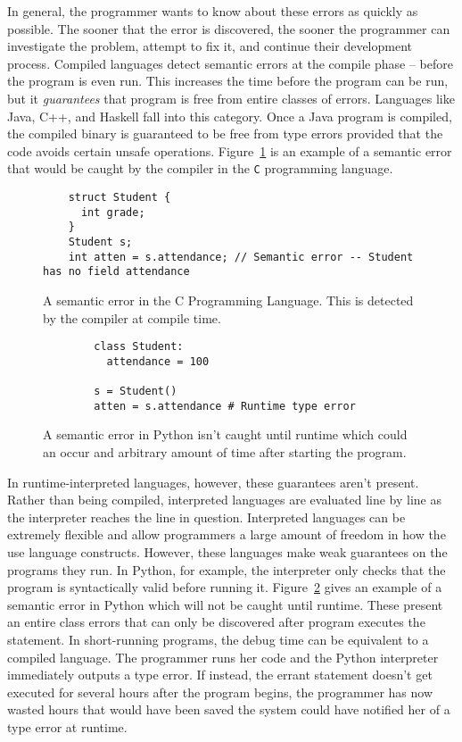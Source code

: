 \documentclass{article}[12pt]
\begin{document}
In general, the programmer wants to know about these errors as quickly as possible. The sooner that the error is
discovered, the sooner the programmer can investigate the problem, attempt to fix it, and continue their development
process. Compiled languages detect semantic errors at the compile phase -- before the program is even run. This
increases the time before the program can be run, but it \emph{guarantees} that program is free from entire classes of
errors. Languages like Java, C++, and Haskell fall into this category. Once a Java program is compiled, the compiled
binary is guaranteed to be free from type errors provided that the code avoids certain unsafe operations.
Figure~\ref{fig:csemanticerror} is an example of a semantic error that would be caught by the compiler in the \texttt{C}
programming language. 
\begin{figure} \begin{verbatim} 
    struct Student { 
      int grade; 
    } 
    Student s; 
    int atten = s.attendance; // Semantic error -- Student has no field attendance 
  \end{verbatim} 
  \caption{A semantic error in the C Programming Language. This is
    detected by the compiler at compile time.} 
  \label{fig:csemanticerror}
\end{figure}

\begin{figure}
    \begin{verbatim}
        class Student:
          attendance = 100

        s = Student()
        atten = s.attendance # Runtime type error
    \end{verbatim}
    \caption{A semantic error in Python isn't caught until runtime which could an occur and
    arbitrary amount of time after starting the program.}
    \label{fig:pythonsemanticerror}
\end{figure}

In runtime-interpreted languages, however, these guarantees aren't present. Rather than being compiled, interpreted
languages are evaluated line by line as the interpreter reaches the line in question. Interpreted languages can be
extremely flexible and allow programmers a large amount of freedom in how the use language constructs. However, these
languages make weak guarantees on the programs they run. In Python, for example, the interpreter only checks that the
program is syntactically valid before running it. Figure~\ref{fig:pythonsemanticerror} gives an example of a semantic
error in Python which will not be caught until runtime. These present an entire class errors that can only be discovered
after program executes the statement. In short-running programs, the debug time can be equivalent to a compiled language. The
programmer runs her code and the Python interpreter immediately outputs a type error. If instead, the errant statement doesn't get
executed for several hours after the program begins, the programmer has now wasted hours that would have been saved the
system could have notified her of a type error at runtime. 
\end{document}
